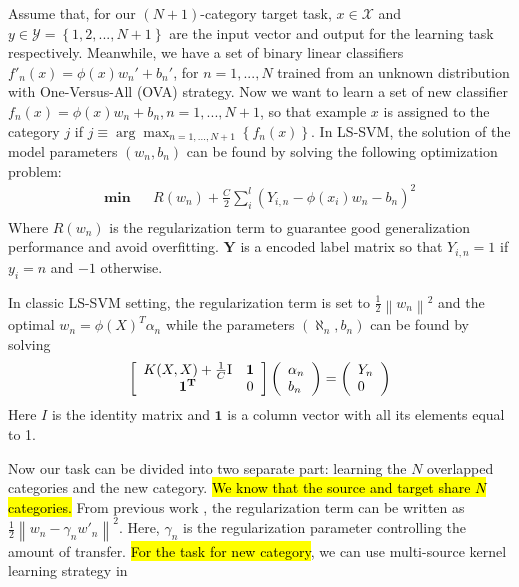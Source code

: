 Assume that, for our $(N+1)$-category target task, ${x} \in \mathcal{X}$ and ${y} \in \mathcal{Y}=\left\{1,2,...,N+1\right\}$ are the input vector and output for the learning task respectively. Meanwhile, we have a set of binary linear classifiers $f'_n(x)=\phi(x)w_n'+b_n'$, for $n=1,...,N$ trained from an unknown distribution with One-Versus-All (OVA) strategy.  Now we want to learn a set of new classifier $f_n(x)=\phi(x)w_n+b_n, n=1,...,N+1$, so that example $x$ is assigned to the category $j$ if $j \equiv \arg {\max _{n = 1,...,N+1}}\left\{{f_n}(x)\right\}$. In LS-SVM, the solution of the model parameters $(w_n,b_n)$ can be found by solving the following optimization problem:
\begin{equation*}
\begin{aligned}
\textbf{min} && R({w_n}) + \frac{C}{2}\sum\limits_i^l {({Y_{i,n}} - \phi ({x_i}){w_n} - {b_n})^2} \\
\end{aligned}
\end{equation*}
Where $R({w_n})$ is the regularization term to guarantee good generalization performance and avoid overfitting. $\mathbf{Y}$ is a encoded label matrix so that $Y_{i,n}=1$ if $y_i=n$ and $-1$ otherwise.  

In classic LS-SVM setting, the regularization term is set to $\frac{1}{2}\left\|w_n\right\|^2$ and the optimal $w_n=\phi(X)^T\alpha_n$ while the parameters $(\aleph_n,b_n)$ can be found by solving
\begin{equation}\label{eq:linear}
\left[ {\begin{array}{*{20}{c}}
{K(X,X) + \frac{1}{C}{\rm{I}}}&\mathbf{1}\\
\mathbf{1^T}&0
\end{array}} \right]\left( \begin{array}{l}
{\alpha _n}\\
{b_n}
\end{array} \right) = \left( \begin{array}{l}
{Y_n}\\
0
\end{array} \right)  
\end{equation}
Here $I$ is the identity matrix and $\mathbf{1}$ is a column vector with all its elements equal to 1.

Now our task can be divided into two separate part: learning the $N$ overlapped categories and the new category. 
\hl{We know that the source and target share $N$ categories.} From previous work \cite{yang2007cross}, the regularization term can be written as $\frac{1}{2}{{{\left\| {{w_n} - {\gamma _n}{{w'}_n}} \right\|}^2}}$. Here, $\gamma_n$ is the regularization parameter controlling the amount of transfer.
\hl{For the task for new category}, we can use multi-source kernel learning strategy in \cite{tommasi2014learning} 



